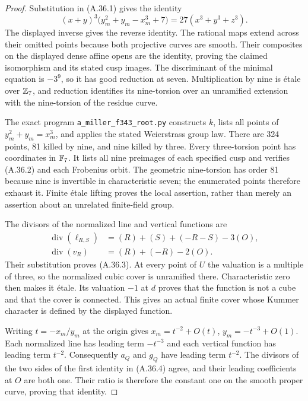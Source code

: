 \begin{proof}
Substitution in (A.36.1) gives the identity
\[
 (x+y)^3\bigl(y_m^2+y_m-x_m^3+7\bigr)
                     =27(x^3+y^3+z^3).
\]
The displayed inverse gives the reverse identity.
The rational maps extend across their omitted points because
both projective curves are smooth. Their composites on the
displayed dense affine opens are the identity, proving the
claimed isomorphism and its stated cusp images.
The discriminant of the minimal equation is $-3^9$,
so it has good reduction at seven. Multiplication by nine
is \'etale over $\mathbb Z_7$, and reduction identifies its
nine-torsion over an unramified extension with the
nine-torsion of the residue curve.

The exact program \texttt{a\_miller\_f343\_root.py}
constructs $k$, lists all points of $y_m^2+y_m=x_m^3$,
and applies the stated Weierstrass group law. There are
324 points, 81 killed by nine, and nine killed by three.
Every three-torsion point has coordinates in $\mathbb F_7$.
It lists all nine preimages of each specified cusp and
verifies (A.36.2) and each Frobenius orbit.
The geometric nine-torsion has order 81 because nine
is invertible in characteristic seven; the enumerated
points therefore exhaust it. Finite \'etale lifting
proves the local assertion, rather than merely an
assertion about an unrelated finite-field group.

The divisors of the normalized line and vertical functions
are
\[
 \begin{split}
 \operatorname{div}(\ell_{R,S})
       &=(R)+(S)+(-R-S)-3(O),\\
 \operatorname{div}(v_R)&=(R)+(-R)-2(O).
 \end{split}
\]
Their substitution proves (A.36.3). At every point of $U$
the valuation is a multiple of three, so the normalized
cubic cover is unramified there. Characteristic zero
then makes it \'etale. Its valuation $-1$ at $d$ proves
that the function is not a cube and that the cover is
connected. This gives an actual finite cover whose Kummer character
is defined by the displayed function.

Writing $t=-x_m/y_m$ at the origin gives
$x_m=t^{-2}+O(t)$, $y_m=-t^{-3}+O(1)$.
Each normalized line has leading term $-t^{-3}$ and
each vertical function has leading term $t^{-2}$.
Consequently $a_Q$ and $g_Q$ have leading term $t^{-2}$.
The divisors of the two sides of the first identity
in (A.36.4) agree, and their leading coefficients at
$O$ are both one. Their ratio is therefore the constant
one on the smooth proper curve, proving that identity.


\end{proof}
